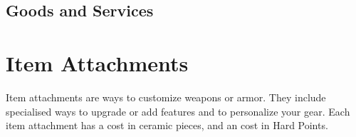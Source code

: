 
\hrulefill

\hrulefill


\FloatBarrier
\subsection{Goods and Services}

\hrulefill

\hrulefill


\FloatBarrier
\section{Item Attachments}

Item attachments are ways to customize weapons or armor. They include specialised
ways to upgrade or add features and to personalize your gear. Each item attachment
has a cost in ceramic pieces, and an cost in Hard Points.

